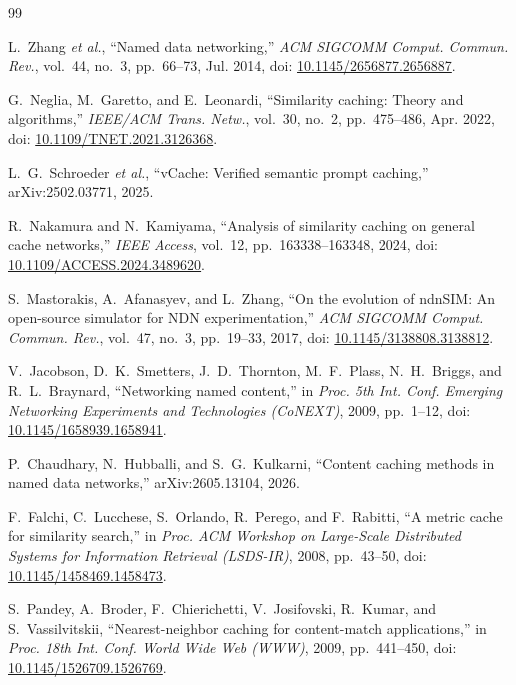 \documentclass[11pt,a4paper]{article}
\begin{document}
\begin{thebibliography}{99}

L.~Zhang \emph{et al.}, ``Named data networking,'' \emph{ACM SIGCOMM Comput. Commun. Rev.},
vol.~44, no.~3, pp.~66--73, Jul. 2014,
doi: \href{https://doi.org/10.1145/2656877.2656887}{10.1145/2656877.2656887}.

G.~Neglia, M.~Garetto, and E.~Leonardi, ``Similarity caching: Theory and algorithms,''
\emph{IEEE/ACM Trans. Netw.}, vol.~30, no.~2, pp.~475--486, Apr. 2022,
doi: \href{https://doi.org/10.1109/TNET.2021.3126368}{10.1109/TNET.2021.3126368}.

L.~G.~Schroeder \emph{et al.}, ``vCache: Verified semantic prompt caching,''
arXiv:2502.03771, 2025.

R.~Nakamura and N.~Kamiyama, ``Analysis of similarity caching on general cache networks,''
\emph{IEEE Access}, vol.~12, pp.~163338--163348, 2024,
doi: \href{https://doi.org/10.1109/ACCESS.2024.3489620}{10.1109/ACCESS.2024.3489620}.

S.~Mastorakis, A.~Afanasyev, and L.~Zhang, ``On the evolution of ndnSIM: An open-source simulator
for NDN experimentation,'' \emph{ACM SIGCOMM Comput. Commun. Rev.}, vol.~47, no.~3, pp.~19--33,
2017, doi: \href{https://doi.org/10.1145/3138808.3138812}{10.1145/3138808.3138812}.

V.~Jacobson, D.~K.~Smetters, J.~D.~Thornton, M.~F.~Plass, N.~H.~Briggs, and R.~L.~Braynard,
``Networking named content,'' in \emph{Proc. 5th Int. Conf. Emerging Networking Experiments and
Technologies (CoNEXT)}, 2009, pp.~1--12,
doi: \href{https://doi.org/10.1145/1658939.1658941}{10.1145/1658939.1658941}.

P.~Chaudhary, N.~Hubballi, and S.~G.~Kulkarni, ``Content caching methods in named data networks,''
arXiv:2605.13104, 2026.

F.~Falchi, C.~Lucchese, S.~Orlando, R.~Perego, and F.~Rabitti, ``A metric cache for similarity
search,'' in \emph{Proc. ACM Workshop on Large-Scale Distributed Systems for Information Retrieval
(LSDS-IR)}, 2008, pp.~43--50,
doi: \href{https://doi.org/10.1145/1458469.1458473}{10.1145/1458469.1458473}.

S.~Pandey, A.~Broder, F.~Chierichetti, V.~Josifovski, R.~Kumar, and S.~Vassilvitskii,
``Nearest-neighbor caching for content-match applications,'' in \emph{Proc. 18th Int. Conf. World
Wide Web (WWW)}, 2009, pp.~441--450,
doi: \href{https://doi.org/10.1145/1526709.1526769}{10.1145/1526709.1526769}.


\end{thebibliography}
\end{document}
